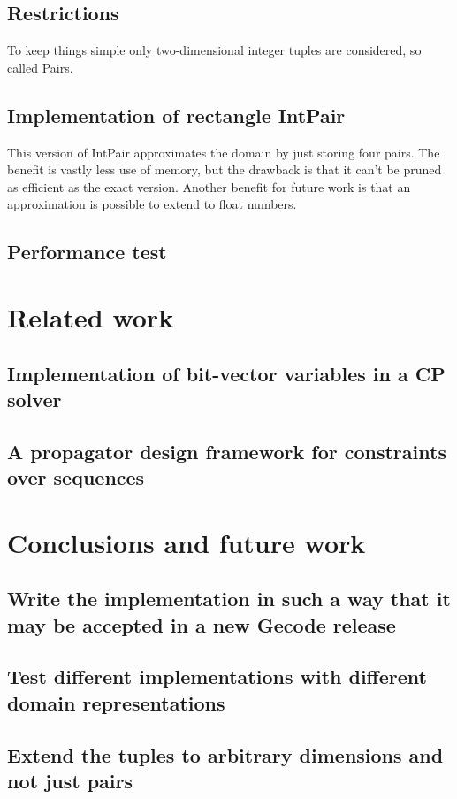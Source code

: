 \documentclass[a4paper,11pt]{article}
\begin{document}
\subsection{Restrictions}
To keep things simple only two-dimensional integer tuples are considered, so called Pairs.

\subsection{Implementation of rectangle IntPair}
This version of IntPair approximates the domain by just storing four pairs. The benefit is vastly less use of memory, but the drawback is that it can't be pruned as efficient as the exact version. Another benefit for future work is that an approximation is possible to extend to float numbers.

\subsection{Performance test}

\section{Related work}
\subsection{Implementation of bit-vector variables in a CP solver}
\subsection{A propagator design framework for constraints over sequences}

\section{Conclusions and future work}

\subsection{Write the implementation in such a way that it may be accepted in a new Gecode release}
\subsection{Test different implementations with different domain representations}
\subsection{Extend the tuples to arbitrary dimensions and not just pairs}
\end{document}
